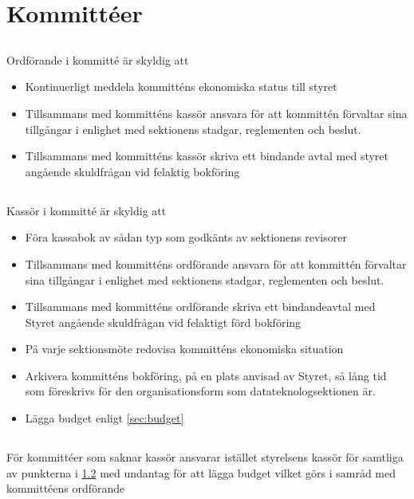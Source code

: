 \documentclass[a4paper, 10pt]{article}
\begin{document}
\section{Kommittéer}
\label{sec:kommitteer}

\subsection{}
Ordförande i kommitté är skyldig att
\begin{itemize}
\item Kontinuerligt meddela kommitténs ekonomiska status till styret
\item Tillsammans med kommitténs kassör ansvara för att kommittén förvaltar sina tillgångar i enlighet med sektionens stadgar, reglementen och beslut.
\item Tillsammans med kommitténs kassör skriva ett bindande avtal med styret angående skuldfrågan vid felaktig bokföring
\end{itemize}
\subsection{}
\label{sec:kommittee_kassor}
Kassör i kommitté är skyldig att
\begin{itemize}
\item Föra kassabok av sådan typ som godkänts av sektionens revisorer
\item Tillsammans med kommitténs ordförande ansvara för att kommittén förvaltar sina tillgångar i enlighet med sektionens stadgar, reglementen och beslut.
\item Tillsammans med kommitténs ordförande skriva ett bindandeavtal med Styret angående skuldfrågan vid felaktigt förd bokföring
\item På varje sektionsmöte redovisa kommitténs ekonomiska situation
\item Arkivera kommitténs bokföring, på en plats anvisad av Styret, så lång tid som föreskrivs för den organisationsform som datateknologsektionen är.
\item Lägga budget enligt \ref{sec:budget}
\end{itemize}
\subsection{}
För kommittéer som saknar kassör ansvarar istället styrelsens kassör för samtliga av punkterna i \ref{sec:kommittee_kassor} med undantag för att lägga budget vilket görs i samråd med kommittéens ordförande
\end{document}
